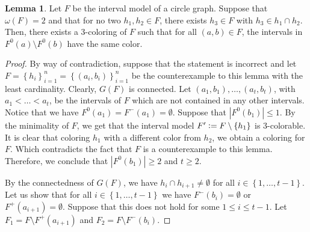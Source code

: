 \documentclass{article}
\theoremstyle{definition}
\newtheorem{lemma}[thm]{Lemma}
\newcommand{\defeq}{\vcentcolon=}
\begin{document}
    \begin{lemma} \label{lemma:4.4}
        Let $F$ be the interval
        model of a circle graph.
        Suppose that $\omega\left(F\right) = 2$ 
        and that for no two
        $h_1, h_2 \in F$,
        there exists $h_3 \in F$ 
        with $h_3 \in h_1 \cap h_2$.
        Then, there exists a 3-coloring
        of $F$ such that for all
        $\left(a, b\right) \in F$, 
        the intervals in $F^{0}\left(a\right) 
        \setminus F^{0}\left(b\right)$
        have the same color. 
    \end{lemma}
    \begin{proof}
        By way of contradiction,
        suppose that the statement is incorrect
        and let $F = \left\{h_{i}\right\}_{i = 1}^{n} =
        \left\{\left(a_{i}, b_{i}\right)\right\}_{i = 1}^{n}$
        be the counterexample
        to this lemma with the
        least cardinality.
        Clearly, $G\left(F\right)$ is 
        connected. 
        Let $\left(a_1, b_1\right),
        \ldots, \left(a_{t}, b_{t}\right)$,
        with $a_1 < \ldots < a_{t}$,
        be the intervals of $F$ which
        are not contained in any other 
        intervals. Notice that we have
        $F^{0}\left(a_{1}\right) = 
        F^{-}\left(a_1\right) = \emptyset$.
        Suppose that $\left|F^{0}\left(b_1\right)\right| \leq 1$.
        By the minimality of $F$,
        we get that the interval
        model $F' \defeq F \setminus \left\{h_{1}\right\}$ 
        is 3-colorable. It is clear
        that coloring $h_1$ with a different
        color from $h_2$, we obtain a coloring
        for $F$. Which contradicts the fact
        that $F$ is a counterexample to this lemma.
        Therefore, we conclude that $\left|F^{0}\left(b_1\right)\right| \geq 2$ 
        and $t \geq 2$.

        By the connectedness of $G\left(F\right)$,
        we have $h_{i} \cap h_{i+1} \neq \emptyset$ 
        for all $i \in \left\{1, \ldots, t -1\right\}$.
        Let us show that for all
        $i \in \left\{1, \ldots, t - 1\right\}$
        we have
        $F^{-}\left(b_{i}\right) = \emptyset$ 
        or $F^{+}\left(a_{i+1}\right) = \emptyset$.
        Suppose that this does not
        hold for some $1 \leq i \leq t - 1$.
        Let $F_1 = F \setminus F^{+}\left(a_{i+1}\right)$
        and $F_2 = F \setminus F^{-}\left(b_{i}\right)$.
        

\end{proof}
\end{document}
